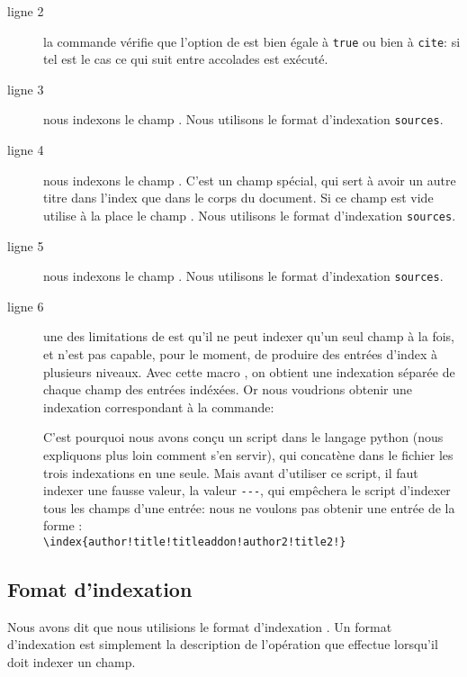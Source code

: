 \begin{description}
\item[ligne 2] la commande  vérifie que l'option  de  est bien égale à \verb|true| ou bien à \verb|cite|: si tel est le cas ce qui suit entre accolades est exécuté.
\item[ligne 3] nous indexons le champ .  Nous utilisons le format d'indexation \verb|sources|.
\item[ligne 4] nous indexons le champ . C'est un champ spécial, qui sert à avoir un autre titre dans l'index que dans le corps du document. Si ce champ est vide  utilise à la place le champ . Nous utilisons le format d'indexation \verb|sources|.
\item[ligne 5] nous indexons le champ . Nous utilisons le format d'indexation \verb|sources|.
\item[ligne 6]  une des limitations de  est qu'il ne peut indexer qu'un seul champ à la fois, et n'est pas capable, pour le moment, de produire des entrées d'index à plusieurs niveaux. 
Avec cette macro , on obtient une indexation séparée de chaque champ des entrées indéxées. 
Or nous voudrions obtenir une indexation correspondant à la commande:
\begin{latexcode} 
\end{latexcode}
 C'est pourquoi nous avons conçu un script dans le langage python (nous expliquons plus loin comment s'en servir), qui concatène dans le fichier  les trois indexations en une seule.
Mais avant d'utiliser ce script, il faut  indexer une fausse valeur, la valeur \verb|---|, qui empêchera le script d'indexer tous les champs d'une entrée: nous ne voulons pas obtenir une entrée de la forme : \\
 \verb|\index{author!title!titleaddon!author2!title2!}|

\end{description}

\subsection{Fomat d'indexation }

Nous avons dit que nous utilisions le format d'indexation . Un format d'indexation   est simplement la description de l'opération que  effectue lorsqu'il doit indexer un champ. 

